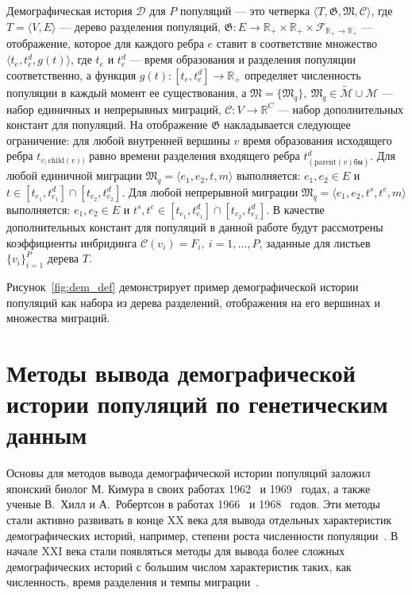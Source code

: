  Демографическая история $\mathcal{D}$ для $P$ популяций --- это четверка ${\langle T, \mathfrak{G}, \mathfrak{M}, \mathcal{C} \rangle}$, где ${T = \langle V, E \rangle}$ --- дерево разделения популяций, ${\mathfrak{G}: E \to \mathbb{R}_+ \times \mathbb{R}_+ \times \mathcal{F}_{\mathbb{R}_+ \to \mathbb{R}_+}}$ --- отображение, которое для каждого ребра $e$ ставит в соответствие множество ${\langle t_e, t^d_e, g(t) \rangle}$, где $t_e$ и $t^d_e$ --- время образования и разделения популяции соответственно, а функция ${g(t): [t_e, t^d_e] \to \mathbb{R}_+}$ определяет численность популяции в каждый момент ее существования, а ${\mathfrak{M} = \{\mathfrak{M}_q\},\ \mathfrak{M}_q \in \widetilde{\mathscr{M}} \cup \mathscr{M}}$ --- набор единичных и непрерывных миграций, $\mathcal{C}: V \to \mathbb{R}^C$ --- набор дополнительных констант для популяций.
На отображение $\mathfrak{G}$ накладывается следующее ограничение: для любой внутренней вершины $v$ время образования исходящего ребра $t_{v, \text{child}(v))}$ равно времени разделения входящего ребра $t^d_{(\text{parent}(v)б м)}$.
Для любой единичной миграции ${\mathfrak{M}_q = \langle e_1, e_2, t, m \rangle}$ выполняется: ${e_1, e_2 \in E}$ и $t \in [t_{e_1}, t^d_{e_1}] \cap [t_{e_2}, t^d_{e_2}]$.
Для любой непрерывной миграции ${\mathfrak{M}_q = \langle e_1, e_2, t^s, t^e, m \rangle}$ выполняется: ${e_1, e_2 \in E}$ и ${t^s, t^e \in [t_{e_1}, t^d_{e_1}] \cap [t_{e_2}, t^d_{e_2}]}$.
В качестве дополнительных констант для популяций в данной работе будут рассмотрены коэффициенты инбридинга $\mathcal{C}(v_i) = F_i,\ i=1,\ldots,P$, заданные для листьев $\{v_i\}_{i=1}^P$ дерева $T$.

Рисунок~\ref{fig:dem_def} демонстрирует пример демографической истории популяций как набора из дерева разделений, отображения на его вершинах и множества миграций.

\section{Методы вывода демографической истории популяций по генетическим данным}
\label{sec:part1:dem_inf}

Основы для методов вывода демографической истории популяций заложил японский биолог М. Кимура в своих работах 1962~\cite{kimura1962probability,kimura1964diffusion} и 1969~\cite{ohta1969linkage} годах, а также ученые В.~Хилл и А.~Робертсон в работах 1966~\cite{hill1966effect} и 1968~\cite{hill1968linkage} годов.
Эти методы стали активно развивать в конце XX века для вывода отдельных характеристик демографических историй, например, степени роста численности популяции~\cite{kuhner1998maximum}.
В начале XXI века стали появляться методы для вывода более сложных демографических историй с большим числом характеристик таких, как численность, время разделения и темпы миграции~\cite{gutenkunst2009inferring, jouganous2017inferring, kamm2017efficient}.

